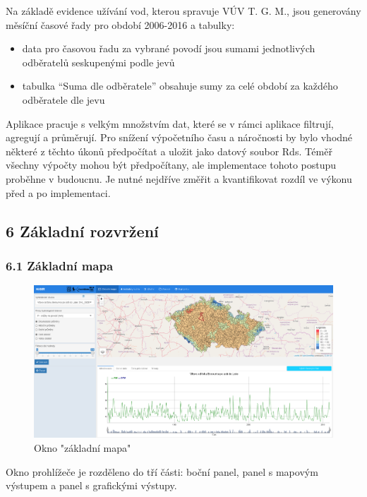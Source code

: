 \documentclass[12pt,]{article}
\providecommand{\tightlist}{%
  \setlength{\itemsep}{0pt}\setlength{\parskip}{0pt}}
\begin{document}
Na základě evidence užívání vod, kterou spravuje VÚV T. G. M., jsou
generovány měsíční časové řady pro období 2006-2016 a tabulky:

\begin{itemize}
\tightlist
\item
  data pro časovou řadu za vybrané povodí jsou sumami jednotlivých
  odběratelů seskupenými podle jevů
\item
  tabulka \enquote{Suma dle odběratele} obsahuje sumy za celé období za
  každého odběratele dle jevu
\end{itemize}

Aplikace pracuje s velkým množstvím dat, které se v rámci aplikace
filtrují, agregují a průměrují. Pro snížení výpočetního času a
náročnosti by bylo vhodné některé z těchto úkonů předpočítat a uložit
jako datový soubor Rds. Téměř všechny výpočty mohou být předpočítany,
ale implementace tohoto postupu proběhne v budoucnu. Je nutné nejdříve
změřit a kvantifikovat rozdíl ve výkonu před a po implementaci.

\subsection{6 Základní rozvržení}\label{zakladni-rozvrzeni}

\subsubsection{6.1 Základní mapa}\label{zakladni-mapa}

\begin{figure}[H]
      \includegraphics[width=\textwidth]{fig/P_ZM}
      \caption{Okno "základní mapa"}
      \label{fig1}
\end{figure}

Okno prohlížeče je rozděleno do tří části: boční panel, panel s mapovým
výstupem a panel s grafickými výstupy.
\end{document}
